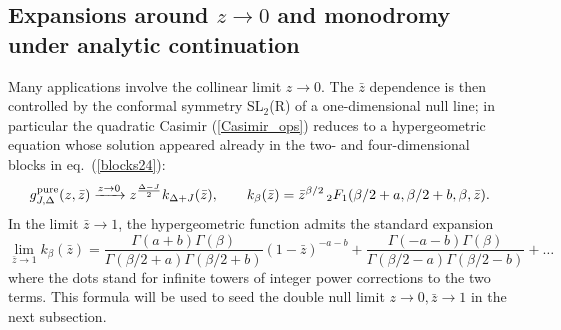 \documentclass[11pt, reqno,preprint]{article}
\def\be{\begin{equation}}
\def\ee{\end{equation}}
\def\gpure{g^{\rm pure}}
\def\zbar{\bar{z}}
\def\j{J}
\begin{document}
\begin{appendix}
\subsection{Expansions around $z\to 0$ and monodromy under analytic continuation}
\label{app:cont}

Many applications involve the collinear limit $z\to 0$. 
The $\zbar$ dependence is then controlled by the conformal symmetry SL${}_2$(R) of a one-dimensional null line;
in particular the quadratic Casimir (\ref{Casimir_ops}) reduces to a hypergeometric equation whose solution
appeared already in the two- and four-dimensional blocks in eq.~(\ref{blocks24}):
\be
 \gpure_{\j,\Delta}(z,\zbar)\xrightarrow{z\to 0} z^{\frac{\Delta-\j}{2}} k_{\Delta+\j}(\zbar), \qquad k_{\beta}(\zbar) =
 \zbar^{\beta/2}\,{}_2F_1(\beta/2+a,\beta/2+b,\beta,\zbar).
\ee
In the limit $\zbar\to 1$, the hypergeometric function admits the standard expansion
\be
 \lim_{\zbar\to 1}k_\beta(\zbar) =
 \frac{\Gamma(a+b)\Gamma(\beta)}{\Gamma(\beta/2+a)\Gamma(\beta/2+b)}(1-\zbar)^{-a-b}
+ \frac{\Gamma(-a-b)\Gamma(\beta)}{\Gamma(\beta/2-a)\Gamma(\beta/2-b)}+\ldots\label{hypers_at_one}
\ee
where the dots stand for infinite towers of integer power corrections to the two terms.
This formula will be used to seed the double null limit $z\to 0,\zbar\to 1$ in the next subsection.


\end{appendix}
\end{document}
